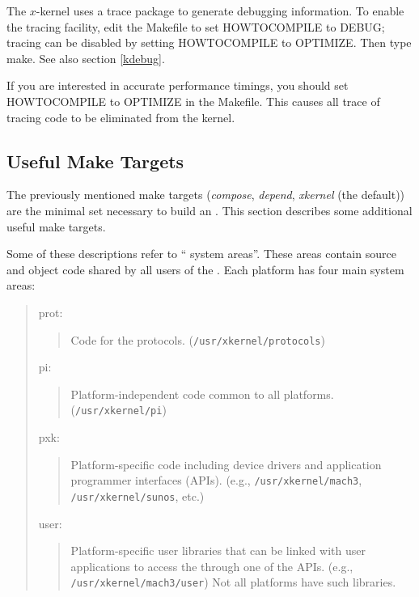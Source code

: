 The $x$-kernel uses a trace package to generate debugging information.
To enable the tracing facility, edit the Makefile to set {\sanss
HOWTOCOMPILE} to {\sanss DEBUG}; tracing can be disabled by setting {\sanss
HOWTOCOMPILE} to {\sanss OPTIMIZE}. Then type {\sanss make}.  See also
section \ref{kdebug}.

If you are interested in accurate performance timings, you should set
{\sanss HOWTOCOMPILE} to {\sanss OPTIMIZE} in the Makefile.  This
causes all trace of tracing code to be eliminated from the kernel.



\subsection{Useful Make Targets}

The previously mentioned make targets ({\em compose}, {\em depend},
{\em xkernel} (the default)) are the minimal set necessary to build an
\xk{}.  This section describes some additional useful make targets.

Some of these descriptions refer to ``\xk{} system areas''.  These
areas contain source and object code shared by all users of the
\xk{}.  Each platform has four main system areas:


\begin{quote}
	prot:
\begin{quote}
		Code for the \xk{} protocols.
		({\tt /usr/xkernel/protocols})
\end{quote}
\smallskip
	
	pi:
\begin{quote}
		Platform-independent code common to all
		platforms.  ({\tt /usr/xkernel/pi})
\end{quote}
\smallskip

	pxk:
\begin{quote}
		Platform-specific code including device
		drivers and application programmer interfaces (APIs).
		(e.g., {\tt /usr/xkernel/mach3},
		{\tt /usr/xkernel/sunos}, etc.)
\end{quote}
\smallskip

	user:
\begin{quote}
		Platform-specific user libraries that can be linked
		with user applications to access the \xk{} through
		one of the \xk{} APIs.  (e.g., {\tt
		/usr/xkernel/mach3/user})  Not all platforms have such
		libraries. 
\end{quote}
\smallskip
\end{quote}
		

